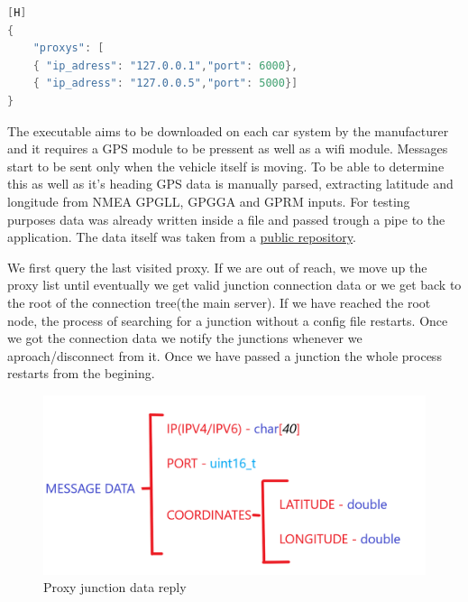 \documentclass[17pt]{article}
\begin{document}
\begin{lstlisting}[language = C++][H]
{
    "proxys": [
    { "ip_adress": "127.0.0.1","port": 6000},
    { "ip_adress": "127.0.0.5","port": 5000}]
}
\end{lstlisting}

The executable aims to be downloaded on each car system by the manufacturer
and it requires a GPS module to be pressent as well as a wifi module. Messages
start to be sent only when the vehicle itself is moving. To be able to
determine this as well as it's heading GPS data is manually parsed, extracting
latitude and longitude from NMEA GPGLL, GPGGA and GPRM inputs. For testing
purposes data was already written inside a file and passed trough a pipe to the
application. The data itself was taken from a \href{https://github.com/ChrisvdHoorn/NMEA_message_GPS_data}{public repository}.

\indent \indent
We first query the last visited proxy. If we are out of reach, we move up the proxy list
until eventually we get valid junction connection data or we get back to
the root of the connection tree(the main server). If we have reached the root node, 
the process of searching for a junction without a config file restarts. Once we got the 
connection data we notify the junctions whenever we aproach/disconnect from it. Once we 
have passed a junction the whole process restarts from the begining.

\begin{figure}[h!]
    \includegraphics[width=\textwidth]{Sketches/ProxyJunctionMessage.png}
    \caption{Proxy junction data reply}
    \label{fig:Proxy junction data reply}
\end{figure}


\pagebreak
\printbibliography
\end{document}

